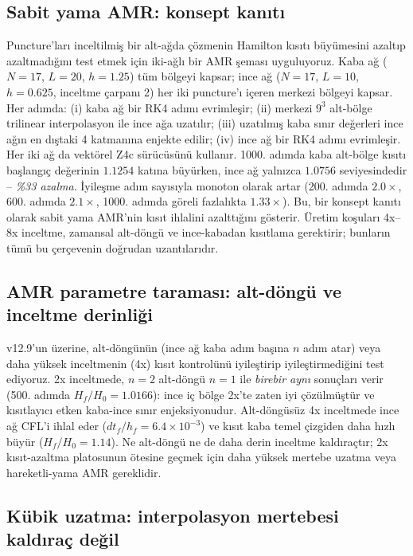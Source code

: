 \subsection{Sabit yama AMR: konsept kanıtı}

Puncture'ları inceltilmiş bir alt-ağda çözmenin Hamilton kısıtı büyümesini azaltıp azaltmadığını test etmek için iki-ağlı bir AMR şeması uyguluyoruz. Kaba ağ ($N=17$, $L=20$, $h=1.25$) tüm bölgeyi kapsar; ince ağ ($N=17$, $L=10$, $h=0.625$, inceltme çarpanı 2) her iki puncture'ı içeren merkezi bölgeyi kapsar. Her adımda: (i) kaba ağ bir RK4 adımı evrimleşir; (ii) merkezi $9^3$ alt-bölge trilinear interpolasyon ile ince ağa uzatılır; (iii) uzatılmış kaba sınır değerleri ince ağın en dıştaki 4 katmanına enjekte edilir; (iv) ince ağ bir RK4 adımı evrimleşir. Her iki ağ da vektörel Z4c sürücüsünü kullanır. 1000. adımda kaba alt-bölge kısıtı başlangıç değerinin $1.1254$ katına büyürken, ince ağ yalnızca $1.0756$ seviyesindedir -- \emph{\%33 azalma}. İyileşme adım sayısıyla monoton olarak artar (200. adımda $2.0\times$, 600. adımda $2.1\times$, 1000. adımda göreli fazlalıkta $1.33\times$). Bu, bir konsept kanıtı olarak sabit yama AMR'nin kısıt ihlalini azalttığını gösterir. Üretim koşuları 4x--8x inceltme, zamansal alt-döngü ve ince-kabadan kısıtlama gerektirir; bunların tümü bu çerçevenin doğrudan uzantılarıdır.

\subsection{AMR parametre taraması: alt-döngü ve inceltme derinliği}

v12.9'un üzerine, alt-döngünün (ince ağ kaba adım başına $n$ adım atar) veya daha yüksek inceltmenin (4x) kısıt kontrolünü iyileştirip iyileştirmediğini test ediyoruz. 2x inceltmede, $n=2$ alt-döngü $n=1$ ile \emph{birebir aynı} sonuçları verir (500. adımda $H_f/H_0 = 1.0166$): ince iç bölge 2x'te zaten iyi çözülmüştür ve kısıtlayıcı etken kaba-ince sınır enjeksiyonudur. Alt-döngüsüz 4x inceltmede ince ağ CFL'i ihlal eder ($dt_f/h_f = 6.4\times 10^{-3}$) ve kısıt kaba temel çizgiden daha hızlı büyür ($H_f/H_0 = 1.14$). Ne alt-döngü ne de daha derin inceltme kaldıraçtır; 2x kısıt-azaltma platosunun ötesine geçmek için daha yüksek mertebe uzatma veya hareketli-yama AMR gereklidir.

\subsection{Kübik uzatma: interpolasyon mertebesi kaldıraç değil}

